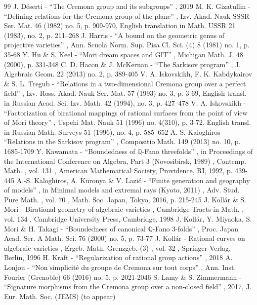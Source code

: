 \documentclass[11pt]{article}
\numberwithin{equation}{section}
\begin{document}
\begin{thebibliography}{99}
 J. Déserti - “The Cremona group and its subgroups” , 2019
 M. K. Gizatullin - “Defining relations for the Cremona group of the plane” , Izv. Akad. Nauk SSSR Ser. Mat. 46 (1982) no. 5, p. 909-970, English translation in Math. USSR 21 (1983), no. 2, p. 211–268
 J. Harris - “A bound on the geometric genus of projective varieties” , Ann. Scuola Norm. Sup. Pisa Cl. Sci. (4) 8 (1981) no. 1, p. 35-68
 Y. Hu \& S. Keel - “Mori dream spaces and GIT” , Michigan Math. J. 48 (2000), p. 331-348
 C. D. Hacon \& J. McKernan - “The Sarkisov program” , J. Algebraic Geom. 22 (2013) no. 2, p. 389-405
 V. A. Iskovskikh, F. K. Kabdykairov \& S. L. Tregub - “Relations in a two-dimensional Cremona group over a perfect field” , Izv. Ross. Akad. Nauk Ser. Mat. 57 (1993) no. 3, p. 3-69, English transl. in Russian Acad. Sci. Izv. Math. 42 (1994), no. 3, p. 427–478
 V. A. Iskovskikh - “Factorization of birational mappings of rational surfaces from the point of view of Mori theory” , Uspehi Mat. Nauk 51 (1996) no. 4(310), p. 3-72, English transl. in Russian Math. Surveys 51 (1996), no. 4, p. 585–652
 A.-S. Kaloghiros - “Relations in the Sarkisov program” , Compositio Math. 149 (2013) no. 10, p. 1685-1709
 Y. Kawamata - “Boundedness of $\mathbb{Q}$-Fano threefolds” , in Proceedings of the International Conference on Algebra, Part 3 (Novosibirsk, 1989) , Contemp. Math. , vol. 131 , American Mathematical Society, Providence, RI, 1992, p. 439-445
 A.-S. Kaloghiros, A. Küronya \& V. Lazić - “Finite generation and geography of models” , in Minimal models and extremal rays (Kyoto, 2011) , Adv. Stud. Pure Math. , vol. 70 , Math. Soc. Japan, Tokyo, 2016, p. 215-245
 J. Kollár \& S. Mori - Birational geometry of algebraic varieties , Cambridge Tracts in Math. , vol. 134 , Cambridge University Press, Cambridge, 1998
 J. Kollár, Y. Miyaoka, S. Mori \& H. Takagi - “Boundedness of canonical $\mathbb{Q}$-Fano 3-folds” , Proc. Japan Acad. Ser. A Math. Sci. 76 (2000) no. 5, p. 73-77
 J. Kollár - Rational curves on algebraic varieties , Ergeb. Math. Grenzgeb. (3) , vol. 32 , Springer-Verlag, Berlin, 1996
 H. Kraft - “Regularization of rational group actions” , 2018
 A. Lonjou - “Non simplicité du groupe de Cremona sur tout corps” , Ann. Inst. Fourier (Grenoble) 66 (2016) no. 5, p. 2021-2046
 S. Lamy \& S. Zimmermann - “Signature morphisms from the Cremona group over a non-closed field” , 2017, J. Eur. Math. Soc. (JEMS) (to appear)

\end{thebibliography}
\end{document}
